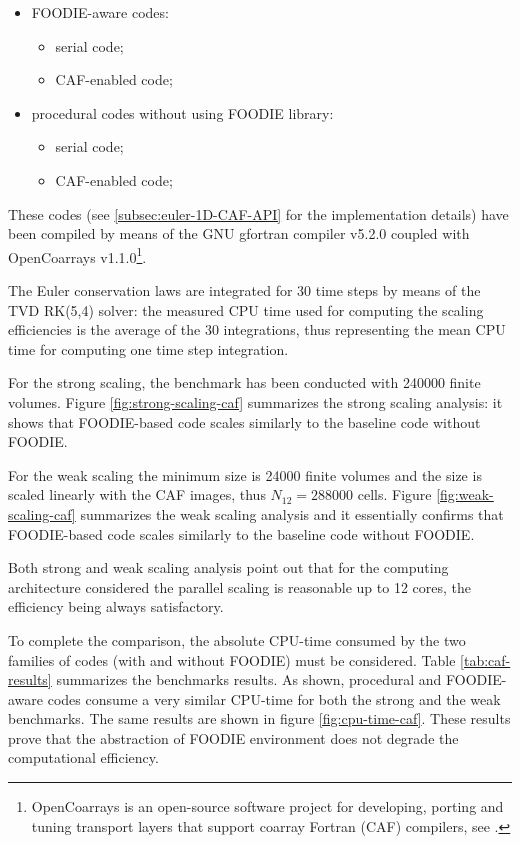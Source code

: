 \begin{itemize}
  \item FOODIE-aware codes:
    \begin{itemize}
      \item serial code;
      \item CAF-enabled code;
      \end{itemize}
  \item procedural codes without using FOODIE library:
    \begin{itemize}
      \item serial code;
      \item CAF-enabled code;
      \end{itemize}
  \end{itemize}

These codes (see \ref{subsec:euler-1D-CAF-API} for the implementation details) have been compiled by means of the GNU gfortran compiler v5.2.0 coupled with OpenCoarrays v1.1.0\footnote{OpenCoarrays is an open-source software project for developing, porting and tuning transport layers that support coarray Fortran (CAF) compilers, see \cite{opencoarrays}.}.

The Euler conservation laws are integrated for 30 time steps by means of the TVD RK(5,4) solver: the measured CPU time used for computing the scaling efficiencies is the average of the 30 integrations, thus representing the mean CPU time for computing one time step integration.

For the strong scaling, the benchmark has been conducted with 240000 finite volumes. Figure \ref{fig:strong-scaling-caf} summarizes the strong scaling analysis: it shows that FOODIE-based code scales similarly to the baseline code without FOODIE.

For the weak scaling the minimum size is 24000 finite volumes and the size is scaled linearly with the CAF images, thus $N_{12} = 288000$ cells. Figure \ref{fig:weak-scaling-caf} summarizes the weak scaling analysis and it essentially confirms that FOODIE-based code scales similarly to the baseline code without FOODIE.

Both strong and weak scaling analysis point out that for the computing architecture considered the parallel scaling is reasonable up to 12 cores, the efficiency being always satisfactory.

To complete the comparison, the absolute CPU-time consumed by the two families of codes (with and without FOODIE) must be considered. Table \ref{tab:caf-results} summarizes the benchmarks results. As shown, procedural and FOODIE-aware codes consume a very similar CPU-time for both the strong and the weak benchmarks. The same results are shown in figure \ref{fig:cpu-time-caf}. These results prove that the abstraction of FOODIE environment does not degrade the computational efficiency.

